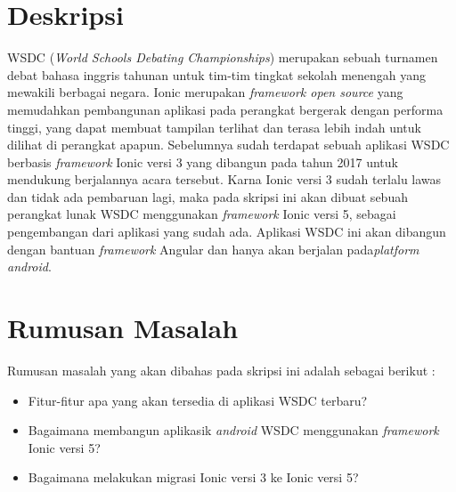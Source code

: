 \documentclass[a4paper,twoside]{article}
\begin{document}
\title{\@judultopik}
\author{\nama \textendash \@npm} 

\newcommand{\nama}{Rajasa Cikal Maulana Solihin}
\newcommand{\@npm}{2017730084}
\newcommand{\@judultopik}{Pembuatan Ulang Aplikasi WSDC 2017 Bali dengan Ionic 5} %
\newcommand{\jumpemb}{1} %
\newcommand{\tanggal}{01/01/1900}


\maketitle


\section{Deskripsi}
WSDC ({\it World Schools Debating Championships}) merupakan sebuah turnamen debat bahasa inggris tahunan untuk tim-tim tingkat sekolah menengah yang mewakili berbagai negara. Ionic merupakan {\it framework open source} yang memudahkan pembangunan aplikasi pada perangkat bergerak dengan performa tinggi, yang dapat membuat tampilan terlihat dan terasa lebih indah untuk dilihat di perangkat apapun. Sebelumnya sudah terdapat sebuah aplikasi WSDC berbasis {\it framework} Ionic versi 3 yang dibangun pada tahun 2017 untuk mendukung berjalannya acara tersebut. Karna Ionic versi 3 sudah terlalu lawas dan tidak ada pembaruan lagi, maka pada skripsi ini akan dibuat sebuah perangkat lunak WSDC menggunakan {\it framework} Ionic versi 5, sebagai pengembangan dari aplikasi yang sudah ada. Aplikasi WSDC ini akan dibangun dengan bantuan {\it framework} Angular dan hanya akan berjalan pada{\it platform android}. 

\section{Rumusan Masalah}
Rumusan masalah yang akan dibahas pada skripsi ini adalah sebagai berikut :
\begin{itemize}
	\item Fitur-fitur apa yang akan tersedia di aplikasi WSDC terbaru?
	\item Bagaimana membangun aplikasik {\it android} WSDC menggunakan {\it framework} Ionic versi 5?
	\item Bagaimana melakukan migrasi Ionic versi 3 ke Ionic versi 5?
\end{itemize}
\end{document}
